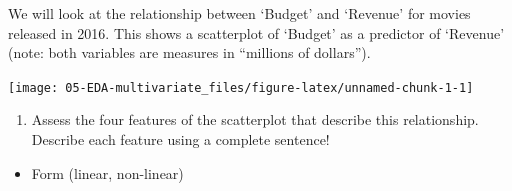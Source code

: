 \documentclass[
]{report}
\newenvironment{Shaded}{\begin{snugshade}}{\end{snugshade}}
\newcommand{\CommentTok}[1]{\textcolor[rgb]{0.56,0.35,0.01}{\textit{#1}}}
\newcommand{\DataTypeTok}[1]{\textcolor[rgb]{0.13,0.29,0.53}{#1}}
\newcommand{\KeywordTok}[1]{\textcolor[rgb]{0.13,0.29,0.53}{\textbf{#1}}}
\newcommand{\NormalTok}[1]{#1}
\newcommand{\OperatorTok}[1]{\textcolor[rgb]{0.81,0.36,0.00}{\textbf{#1}}}
\newcommand{\OtherTok}[1]{\textcolor[rgb]{0.56,0.35,0.01}{#1}}
\newcommand{\StringTok}[1]{\textcolor[rgb]{0.31,0.60,0.02}{#1}}
\providecommand{\tightlist}{%
  \setlength{\itemsep}{0pt}\setlength{\parskip}{0pt}}
\begin{document}
We will look at the relationship between `Budget' and `Revenue' for movies released in 2016. This shows a scatterplot of `Budget' as a predictor of `Revenue' (note: both variables are measures in ``millions of dollars'').

\begin{Shaded}
\end{Shaded}

\begin{center}\texttt{[image: 05-EDA-multivariate\_files/figure-latex/unnamed-chunk-1-1]} \end{center}

\begin{enumerate}
\def\labelenumi{\arabic{enumi}.}
\setcounter{enumi}{2}
\tightlist
\item
  Assess the four features of the scatterplot that describe this relationship. Describe each feature using a complete sentence!
\end{enumerate}

\begin{itemize}
\tightlist
\item
  Form (linear, non-linear)
\end{itemize}

\vspace{.4in}
\end{document}
